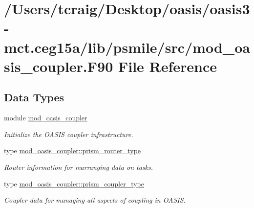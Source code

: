 \hypertarget{mod__oasis__coupler_8_f90}{\section{/\+Users/tcraig/\+Desktop/oasis/oasis3-\/mct.ceg15a/lib/psmile/src/mod\+\_\+oasis\+\_\+coupler.F90 File Reference}
\label{mod__oasis__coupler_8_f90}
}
\subsection*{Data Types}
\begin{DoxyCompactItemize}
\item 
module \hyperlink{classmod__oasis__coupler}{mod\+\_\+oasis\+\_\+coupler}
\begin{DoxyCompactList}\small\item\em Initialize the O\+A\+S\+I\+S coupler infrastructure. \end{DoxyCompactList}\item 
type \hyperlink{structmod__oasis__coupler_1_1prism__router__type}{mod\+\_\+oasis\+\_\+coupler\+::prism\+\_\+router\+\_\+type}
\begin{DoxyCompactList}\small\item\em Router information for rearranging data on tasks. \end{DoxyCompactList}\item 
type \hyperlink{structmod__oasis__coupler_1_1prism__coupler__type}{mod\+\_\+oasis\+\_\+coupler\+::prism\+\_\+coupler\+\_\+type}
\begin{DoxyCompactList}\small\item\em Coupler data for managing all aspects of coupling in O\+A\+S\+I\+S. \end{DoxyCompactList}\end{DoxyCompactItemize}
